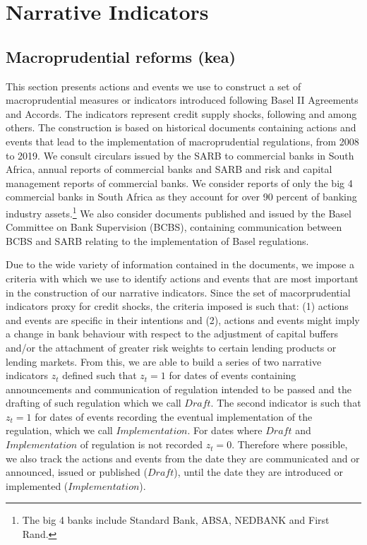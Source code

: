 \documentclass[
  letterpaper,
  DIV=11,
  numbers=noendperiod]{scrartcl}
\begin{document}
\hypertarget{narrative-indicators}{%
\section{Narrative Indicators}\label{narrative-indicators}}

\hypertarget{macroprudential-reforms-kea}{%
\subsection{Macroprudential reforms
(kea)}\label{macroprudential-reforms-kea}}

This section presents actions and events we use to construct a set of
macroprudential measures or indicators introduced following Basel II
Agreements and Accords. The indicators represent credit supply shocks,
following \cite{noss2016estimating} and \cite{deli2017real} among
others. The construction is based on historical documents containing
actions and events that lead to the implementation of macroprudential
regulations, from 2008 to 2019. We consult circulars issued by the SARB
to commercial banks in South Africa, annual reports of commercial banks
and SARB and risk and capital management reports of commercial banks. We
consider reports of only the big 4 commercial banks in South Africa as
they account for over 90 percent of banking industry
assets.\footnote{The big 4 banks include Standard Bank, ABSA, NEDBANK and First Rand.}
We also consider documents published and issued by the Basel Committee
on Bank Supervision (BCBS), containing communication between BCBS and
SARB relating to the implementation of Basel regulations.

Due to the wide variety of information contained in the documents, we
impose a criteria with which we use to identify actions and events that
are most important in the construction of our narrative indicators.
Since the set of macorprudential indicators proxy for credit shocks, the
criteria imposed is such that: (1) actions and events are specific in
their intentions and (2), actions and events might imply a change in
bank behaviour with respect to the adjustment of capital buffers and/or
the attachment of greater risk weights to certain lending products or
lending markets. From this, we are able to build a series of two
narrative indicators \(z_{t}\) defined such that \(z_{t}=1\) for dates
of events containing announcements and communication of regulation
intended to be passed and the drafting of such regulation which we call
\(Draft\). The second indicator is such that \(z_{t}=1\) for dates of
events recording the eventual implementation of the regulation, which we
call \(Implementation\). For dates where \(Draft\) and
\(Implementation\) of regulation is not recorded \(z_{t}=0\). Therefore
where possible, we also track the actions and events from the date they
are communicated and or announced, issued or published (\(Draft\)),
until the date they are introduced or implemented (\(Implementation\)).
\end{document}
